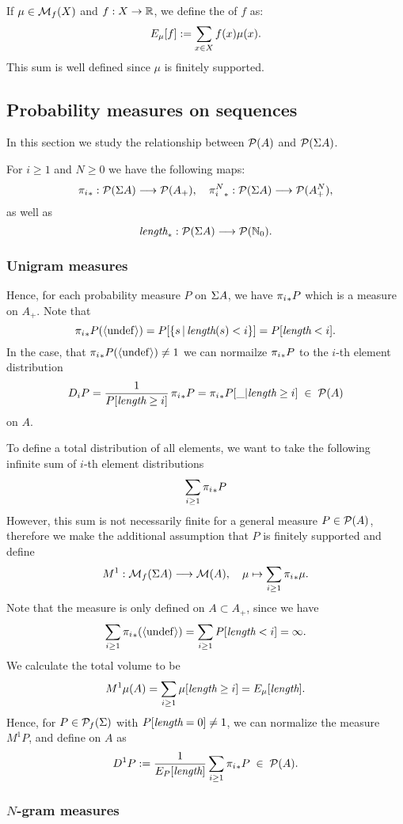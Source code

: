 \documentclass[11pt]{article}
\begin{document}
If $\mu \in \mathcal{M}_f(X)$ and $f:X \rightarrow {\mathbb R}$, we define the 
of $f$ as:
\[ E_{\mu}[f] :=  \sum_{x \in X} f(x) \mu(x). \]
This sum is well defined since $\mu$ is  finitely supported.

\subsection{Probability measures on sequences}


In this section we study the relationship between $\mathcal{P}(A)$ and
$\mathcal{P}(\Sigma A)$.

For $i \geq 1$ and $N \geq 0$ we have the following maps:
\[ {\pi_{i}}_*: \mathcal{P}(\Sigma A) \longrightarrow \mathcal{P}(A_+), \quad {\pi_{i}^{N}}_*: \mathcal{P}(\Sigma A) \longrightarrow \mathcal{P}(A^N_+), \]
as well as
\[ \text{\it length}_*: \mathcal{P}(\Sigma A) \longrightarrow \mathcal{P}({\mathbb N}_0). \]

\subsubsection{Unigram measures}

Hence, for each probability measure $P$ on $\Sigma A$, we have
${\pi_{i}}_* P$ which is a measure on $A_+$. Note that
\[ {\pi_{i}}_* P (\langle \mathrm{undef} \rangle) = P[\{s \,|\, \text{\it length}(s) < i \}] = P[\text{\it length} < i]. \]
In the case, that ${\pi_{i}}_* P (\langle \mathrm{undef} \rangle) \neq 1$ we can normailze
${\pi_{i}}_* P$ to the $i$-th element distribution
\[ D_i P = \frac{1}{P[\text{\it length} \geq i]} \, {\pi_{i}}_* P = {\pi_{i}}_*P[\_|\text{\it length}
\geq i]  \;\in\; \mathcal{P}(A)\]
on $A$.

To define a total distribution of all elements, we want to take the
following infinite sum of $i$-th element distributions
\[ \sum_{i \geq 1} {\pi_{i}}_* P \]
However, this sum is not necessarily finite for a general measure $P
\in \mathcal{P}(A)$, therefore we make the additional assumption that $P$
is finitely supported and define
\[ M^1 : \mathcal{M}_f(\Sigma A) \longrightarrow \mathcal{M}(A), \quad \mu \mapsto 
         \sum_{i \geq 1} {\pi_{i}}_* \mu. \]
Note that the measure is only defined on $A \subset A_+$, since
we have
\[ \sum_{i \geq 1} {\pi_{i}}_*(\langle \mathrm{undef} \rangle) = \sum_{i \geq 1} P[\text{\it length} < i] =
\infty. \]
We calculate the total volume to be
\[ M^1 \mu(A) = \sum_{i \geq 1} \mu[\text{\it length} \geq i] = E_{\mu}[\text{\it length}]. \]
Hence, for $P \in \mathcal{P}_f(\Sigma)$ with $P[\text{\it length} = 0] \neq 1$, we can
normalize the measure $M^1P$, and define  on
$A$ as
\[ D^1 P := \frac{1}{E_{P}[\text{\it length}]} \sum_{i \geq 1} {\pi_{i}}_* P \;\in\;
\mathcal{P}(A). \]

\subsubsection{$N$-gram measures}
\end{document}
